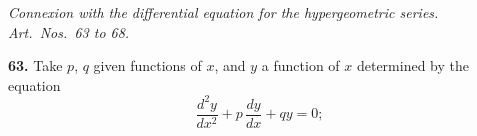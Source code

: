 \documentclass[11pt]{article}
\newcommand{\artno}[1]{\textbf{#1.}\quad}
\begin{document}
\bigskip

\begin{center}
\textit{Connexion with the differential equation for the hypergeometric series. Art.\ Nos.\ 63 to 68.}
\end{center}

\medskip

\artno{63} Take $p$, $q$ given functions of $x$, and $y$ a function of $x$ determined by the
equation
\[
   \frac{d^{2}y}{dx^{2}} + p\,\frac{dy}{dx} + qy = 0;
\]
\end{document}
